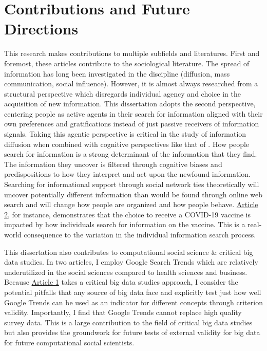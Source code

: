 \section{Contributions and Future Directions}

This research makes contributions to multiple subfields and literatures. First
and foremost, these articles contribute to the sociological literature. The
spread of information has long been investigated in the discipline (diffusion,
mass communication, social influence). However, it is almost always researched
from a structural perspective which disregards individual agency and choice in
the acquisition of new information. This dissertation adopts the second
perspective, centering people as active agents in their search for information
aligned with their own preferences and gratifications instead of just passive
receivers of information signals. Taking this agentic perspective is critical in
the study of information diffusion when combined with cognitive perspectives
like that of \citet{goldbergSocialContagionAssociative2018}. How people search
for information is a strong determinant of the information that they find. The
information they uncover is filtered through cognitive biases and
predispositions to how they interpret and act upon the newfound information.
Searching for informational support through social network ties theoretically
will uncover potentially different information than would be found through
online web search and will change how people are organized and how people
behave. \hyperlink{paper-2}{Article 2}, for instance, demonstrates that the
choice to receive a COVID-19 vaccine is impacted by how individuals search for
information on the vaccine. This is a real-world consequence to the variation in
the individual information search process.

This dissertation also contributes to computational social science \& critical
big data studies. In two articles, I employ Google Search Trends which are
relatively underutilized in the social sciences compared to health sciences and
business. Because \hyperlink{paper-1}{Article 1} takes a critical big data
studies approach, I consider the potential pitfalls that any source of big data
face \citep{mcfarlandBigDataDanger2015} and explicitly test just how well Google
Trends can be used as an indicator for different concepts through criterion
validity. Importantly, I find that Google Trends cannot replace high quality
survey data. This is a large contribution to the field of critical big data
studies but also provides the groundwork for future tests of external validity
for big data for future computational social scientists.


